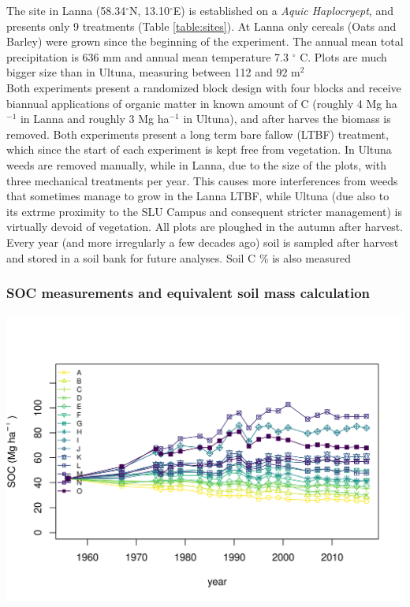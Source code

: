 \documentclass[review]{elsarticle}
\begin{document}
The site in Lanna (58.34$^{\circ}$N, 13.10$^{\circ}$E) is established on a \textit{Aquic Haplocryept}, and presents only 9 treatments (Table  \ref{table:sites}).
At Lanna only cereals (Oats and Barley) were grown since the beginning of the experiment. The annual mean total precipitation is 636 mm and annual mean temperature 7.3 $^{\circ}$ C. Plots are much bigger size than in Ultuna, measuring between 112 and 92 m$^2$ \\
Both experiments present a randomized block design with four blocks and receive biannual applications of organic matter in known amount of C (roughly 4 Mg ha$^{-1}$ in Lanna\cite{Katterer2014} and roughly 3 Mg ha$^{-1}$ in Ultuna\cite{Katterer2011}), and after harves the biomass is removed. Both experiments present a long term bare fallow (LTBF) treatment, which since the start of each experiment is kept free from vegetation. In Ultuna weeds are removed manually, while in Lanna, due to the size of the plots, with three mechanical treatments per year. This causes more interferences from weeds that sometimes manage to grow in the Lanna LTBF, while Ultuna (due also to its extrme proximity to the SLU Campus and consequent stricter management) is virtually devoid of vegetation. All plots are ploughed in the autumn after harvest.\\
Every year (and more irregularly a few decades ago) soil is sampled after harvest and stored in a soil bank for future analyses. Soil C \% is also measured 


\subsubsection{SOC measurements and equivalent soil mass calculation}
\includegraphics[width=\textwidth]{Ultuna_SOC_data_used.png}
\end{document}
